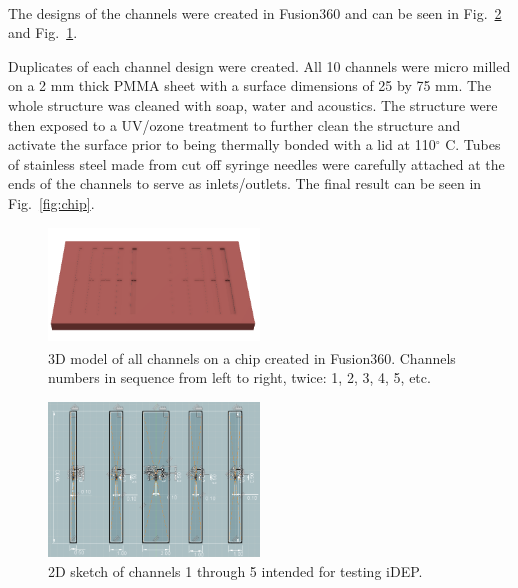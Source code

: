 \documentclass[journal, a4paper]{IEEEtran}
\begin{document}
The designs of the channels were created in Fusion360\textsuperscript{\textregistered} and can be seen in Fig.~\ref{fig:CAD} and Fig.~\ref{fig:CAD3D}.

Duplicates of each channel design were created. All 10 channels were micro milled on a 2 mm thick PMMA sheet with a surface dimensions of 25 by 75 mm. The whole structure was cleaned with soap, water and acoustics. The structure were then exposed to a UV/ozone treatment to further clean the structure and activate the surface prior to being thermally bonded with a lid at 110$^{\circ}$ C. Tubes of stainless steel made from cut off syringe needles were carefully attached at the ends of the channels to serve as inlets/outlets. The final result can be seen in Fig.~\ref{fig:chip}.

\begin{figure}
	\begin{center}
\includegraphics[width=0.5\textwidth]{cad3De.png}
		\caption{\label{fig:CAD3D} 3D model of all channels on a chip created in Fusion360\textsuperscript{\textregistered}. Channels numbers in sequence from left to right, twice: 1, 2, 3, 4, 5, etc.}
    \end{center}
\end{figure}

\begin{figure}
\begin{center}
\includegraphics[width=0.5\textwidth]{sketch2d.png}
		\caption{\label{fig:CAD} 2D sketch of channels 1 through 5 intended for testing iDEP.}
        \end{center}
\end{figure}
\end{document}
